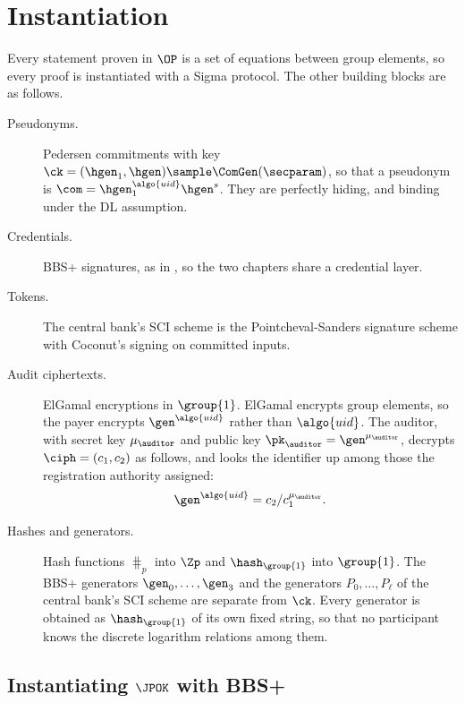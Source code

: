 \section{Instantiation}\label{sec:offline-instantiation}

Every statement proven in $\OP$ is a set of equations between group elements,
so every proof is instantiated with a Sigma protocol. The other building blocks
are as follows.

\begin{description}

  \item[Pseudonyms.] Pedersen commitments with key $\ck = (\hgen_1, \hgen)
\sample \ComGen(\secparam)$, so that a pseudonym is $\com = \hgen_1^{\algo{uid}}
\hgen^{s}$. They are perfectly hiding, and binding under the DL assumption.

  \item[Credentials.] BBS+ signatures, as in , so the two
chapters share a credential layer.

  \item[Tokens.] The central bank's SCI scheme is the Pointcheval-Sanders
signature scheme with Coconut's signing on committed inputs.

  \item[Audit ciphertexts.] ElGamal encryptions in $\group{1}$. ElGamal encrypts
group elements, so the payer encrypts $\gen^{\algo{uid}}$ rather than
$\algo{uid}$. The auditor, with secret key $\mu_\auditor$ and public key
$\pk_\auditor = \gen^{\mu_\auditor}$, decrypts $\ciph = (c_1, c_2)$ as follows,
and looks the identifier up among those the registration authority assigned:
%
\begin{equation*}
  \gen^{\algo{uid}} = c_2 / c_1^{\mu_\auditor}.
\end{equation*}

  \item[Hashes and generators.] Hash functions $\hash_p$ into $\Zp$ and
$\hash_{\group{1}}$ into $\group{1}$. The BBS+ generators $\gen_0, \ldots,
\gen_3$ and the generators $P_0, \ldots, P_\ell$ of the central bank's SCI
scheme are separate from $\ck$. Every generator is obtained as
$\hash_{\group{1}}$ of its own fixed string, so that no participant knows the
discrete logarithm relations among them.

\end{description}

\subsection{Instantiating $\JPOK$ with BBS+}\label{sec:joint-proof}

